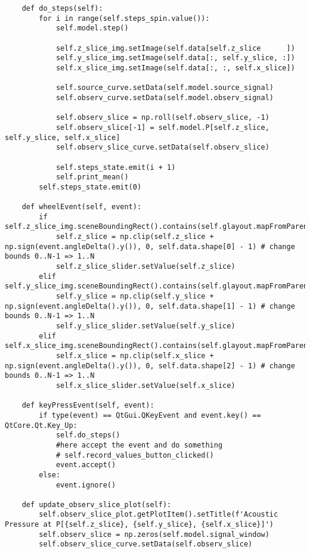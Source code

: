 \documentclass[../main.tex]{subfiles}
\begin{document}
\begin{lstlisting}
    def do_steps(self):
        for i in range(self.steps_spin.value()):
            self.model.step()

            self.z_slice_img.setImage(self.data[self.z_slice      ])
            self.y_slice_img.setImage(self.data[:, self.y_slice, :])
            self.x_slice_img.setImage(self.data[:, :, self.x_slice])
           
            self.source_curve.setData(self.model.source_signal)
            self.observ_curve.setData(self.model.observ_signal)

            self.observ_slice = np.roll(self.observ_slice, -1)
            self.observ_slice[-1] = self.model.P[self.z_slice, self.y_slice, self.x_slice]
            self.observ_slice_curve.setData(self.observ_slice)

            self.steps_state.emit(i + 1)
            self.print_mean()
        self.steps_state.emit(0)       

    def wheelEvent(self, event):
        if self.z_slice_img.sceneBoundingRect().contains(self.glayout.mapFromParent(event.pos())):
            self.z_slice = np.clip(self.z_slice + np.sign(event.angleDelta().y()), 0, self.data.shape[0] - 1) # change bounds 0..N-1 => 1..N
            self.z_slice_slider.setValue(self.z_slice)
        elif self.y_slice_img.sceneBoundingRect().contains(self.glayout.mapFromParent(event.pos())):
            self.y_slice = np.clip(self.y_slice + np.sign(event.angleDelta().y()), 0, self.data.shape[1] - 1) # change bounds 0..N-1 => 1..N
            self.y_slice_slider.setValue(self.y_slice)
        elif self.x_slice_img.sceneBoundingRect().contains(self.glayout.mapFromParent(event.pos())):
            self.x_slice = np.clip(self.x_slice + np.sign(event.angleDelta().y()), 0, self.data.shape[2] - 1) # change bounds 0..N-1 => 1..N
            self.x_slice_slider.setValue(self.x_slice)

    def keyPressEvent(self, event):
        if type(event) == QtGui.QKeyEvent and event.key() == QtCore.Qt.Key_Up:
            self.do_steps()
            #here accept the event and do something
            # self.record_values_button_clicked()
            event.accept()
        else:
            event.ignore()

    def update_observ_slice_plot(self):
        self.observ_slice_plot.getPlotItem().setTitle(f'Acoustic Pressure at P[{self.z_slice}, {self.y_slice}, {self.x_slice}]')
        self.observ_slice = np.zeros(self.model.signal_window)
        self.observ_slice_curve.setData(self.observ_slice)


\end{lstlisting}
\end{document}
